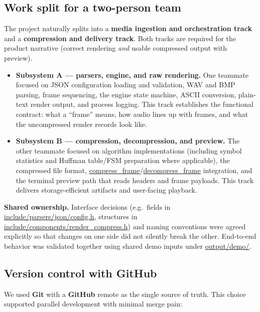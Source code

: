 \subsection{Work split for a two-person team}
The project naturally splits into a \textbf{media ingestion and orchestration track} and a \textbf{compression and delivery track}. Both tracks are required for the product narrative (correct rendering \emph{and} usable compressed output with preview).

\begin{itemize}
    \item \textbf{Subsystem A — parsers, engine, and raw rendering.} One teammate focused on JSON configuration loading and validation, WAV and BMP parsing, frame sequencing, the engine state machine, ASCII conversion, plain-text render output, and process logging. This track establishes the functional contract: what a ``frame'' means, how audio lines up with frames, and what the uncompressed render records look like.
    \item \textbf{Subsystem B — compression, decompression, and preview.} The other teammate focused on algorithm implementations (including symbol statistics and Huffman table/FSM preparation where applicable), the compressed file format, \url{compress_frame}/\url{decompress_frame} integration, and the terminal preview path that reads headers and frame payloads. This track delivers storage-efficient artifacts and user-facing playback.
\end{itemize}

\textbf{Shared ownership.} Interface decisions (e.g.\ fields in \url{include/parsers/json/config.h}, structures in \url{include/components/render_compress.h}) and naming conventions were agreed explicitly so that changes on one side did not silently break the other. End-to-end behavior was validated together using shared demo inputs under \url{output/demo/}.

\subsection{Version control with GitHub}
We used \textbf{Git} with a \textbf{GitHub} remote as the single source of truth. This choice supported parallel development with minimal merge pain:

